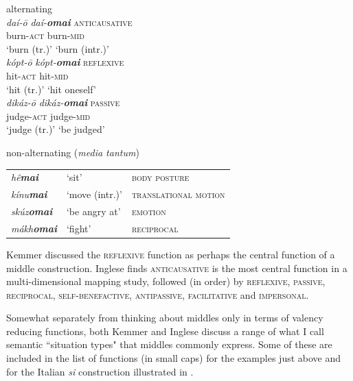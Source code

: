\documentclass[output=paper,colorlinks,citecolor=brown
]{langscibook}
\begin{document}
\ea alternating \label{ex:Payne:AGreekAlternate}\\
\ea
\gll \textit{daí-ō}      \textit{daí-\textbf{omai}}   \textsc{anticausative}\\
  burn-\textsc{act}     burn-\textsc{mid}\\
\glt `burn (tr.)'     `burn (intr.)'\\

\ex
\gll \textit{kópt-ō}  	  \textit{kópt-\textbf{omai}}   \textsc{reflexive}\\
  hit-\textsc{act}     hit-\textsc{mid} \\
\glt    `hit (tr.)'     `hit oneself'\\

\ex
\gll \textit{dikáz-ō}     \textit{dikáz-\textbf{omai} }   \textsc{passive} \\
  judge-\textsc{act}     judge-\textsc{mid} \\
\glt    `judge (tr.)'     `be judged' \\
 \z 
 \z

 \ea non-alternating (\textit{media tantum}) \label{ex:Payne:AGreekMediatantum}\\
 \begin{tabular}{lll}
\textit{hê\textbf{mai}} & ‘sit’	& \textsc{body posture}\\
\textit{kínu\textbf{mai}} & ‘move (intr.)’ & \textsc{translational motion}\\
\textit{skúz\textbf{omai}} & ‘be angry at’ & \textsc{emotion}\\
\textit{mákh\textbf{omai}} & ‘fight’ & \textsc{reciprocal}\\
\end{tabular}
\z 

Kemmer discussed the \textsc{reflexive} function as perhaps the central function of a middle construction. Inglese finds \textsc{anticausative} is the most central function in a multi-dimensional mapping study, followed (in order) by \textsc{reflexive, passive, reciprocal, self-benefactive, antipassive, facilitative} and \textsc{impersonal}.  

Somewhat separately from thinking about middles only in terms of valency reducing functions, both Kemmer and Inglese discuss a range of what I call semantic ``situation types" that middles commonly express. Some of these are included in the list of functions (in small caps) for the examples just above and for the Italian \textit{si} construction illustrated in .
\end{document}
